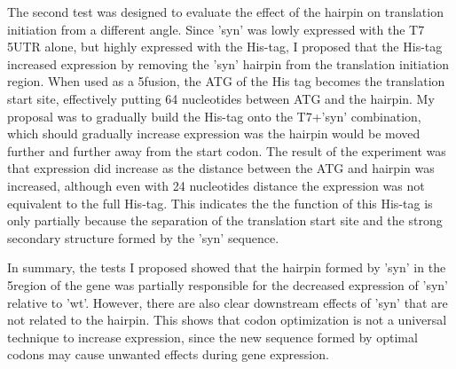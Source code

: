 The second test was designed to evaluate the effect of the hairpin on
translation initiation from a different angle. Since 'syn' was lowly expressed
with the T7 5\p UTR alone, but highly expressed with the His-tag, I proposed
that the His-tag increased expression by removing the 'syn' hairpin from the
translation initiation region. When used as a 5\p fusion, the ATG of the His
tag becomes the translation start site, effectively putting 64 nucleotides
between ATG and the hairpin. My proposal was to gradually build the His-tag
onto the T7+'syn' combination, which should gradually increase expression was
the hairpin would be moved further and further away from the start codon. The
result of the experiment was that expression did increase as the distance
between the ATG and hairpin was increased, although even with 24 nucleotides
distance the expression was not equivalent to the full His-tag. This indicates
the the function of this His-tag is only partially because the separation of
the translation start site and the strong secondary structure formed by the
'syn' sequence.

In summary, the tests I proposed showed that the hairpin formed by 'syn' in the
5\p region of the gene was partially responsible for the decreased expression
of 'syn' relative to 'wt'. However, there are also clear downstream effects of
'syn' that are not related to the hairpin. This shows that codon optimization
is not a universal technique to increase expression, since the new sequence
formed by optimal codons may cause unwanted effects during gene expression. 


